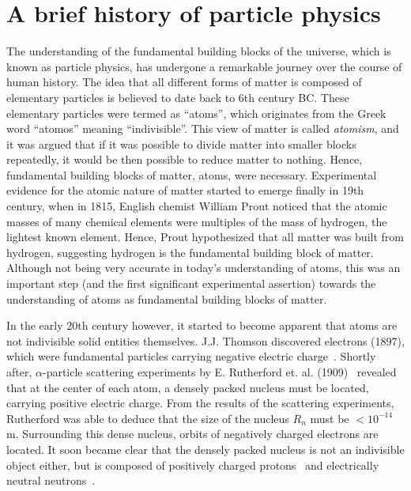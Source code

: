 \section{A brief history of particle physics}

\graphicspath{{1_TheoreticalBackground/Figures}}

The understanding of the fundamental building blocks of the universe, which is known as particle
physics, has undergone a remarkable journey over the course of human history. The idea that all 
different forms of matter is composed of elementary particles is believed to date back to 
6th century BC. These elementary particles
were termed as ``atoms'', which originates from the Greek word ``atomos'' meaning ``indivisible''.
This view of matter is called \textit{atomism}, and it was argued that if it was possible to divide
matter into smaller blocks repeatedly, it would be then possible to reduce matter to nothing.
Hence, fundamental building blocks of matter, atoms, were necessary.
Experimental evidence for the atomic nature of matter started to emerge finally
in 19th century, when in 1815, English chemist William Prout noticed that the atomic masses
of many chemical elements were multiples of the mass of hydrogen, the lightest known element.
Hence, Prout hypothesized that all matter was built from hydrogen, suggesting hydrogen is the 
fundamental building block of matter. Although not being very accurate in today's understanding of atoms,
this was an important step (and the first significant experimental assertion) towards the understanding
of atoms as fundamental building blocks of matter.   

In the early 20th century however, it started to become apparent that
atoms are not indivisible solid entities themselves. J.J. Thomson discovered electrons (1897),
which were fundamental particles carrying negative electric charge~\cite{Thomson:1897cm}.
Shortly after, $\alpha$-particle scattering experiments by E. Rutherford et. al. (1909)~\cite{Rutherford:1911zz} 
revealed that at the center of each atom, a densely packed nucleus
must be located, carrying positive electric charge. From the results of the 
scattering experiments, Rutherford was able to deduce that the size of the nucleus $R_{n}$ must be $< 10^{-14}$ m.
Surrounding this dense nucleus, orbits of negatively charged electrons are located. It soon became clear that
the densely packed nucleus is not an indivisible object either, but is composed of positively charged 
protons~\cite{Rutherford:1919fnt}
and electrically neutral neutrons~\cite{Chadwick:1932ma}.


